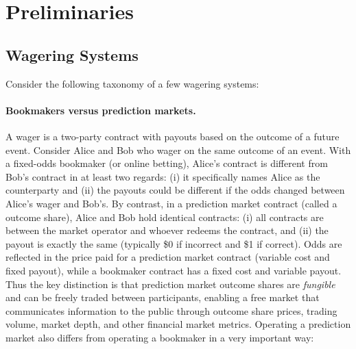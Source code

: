 \section{Preliminaries}

\subsection{Wagering Systems}

Consider the following taxonomy of a few wagering systems:


\paragraph{Bookmakers versus prediction markets.}

A wager is a two-party contract with payouts based on the outcome of a future event. Consider Alice and Bob who wager on the same outcome of an event. With a fixed-odds bookmaker (or online betting), Alice's contract is different from Bob's contract in at least two regards: (i) it specifically names Alice as the counterparty and (ii) the payouts could be different if the odds changed between Alice's wager and Bob's. By contrast, in a prediction market contract (called a outcome share), Alice and Bob hold identical contracts: (i) all contracts are between the market operator and whoever redeems the contract, and (ii) the payout is exactly the same (typically \$0 if incorrect and \$1 if correct). Odds are reflected in the price paid for a prediction market contract (\ie variable cost and fixed payout), while a bookmaker contract has a fixed cost and variable payout. Thus the key distinction is that prediction market outcome shares are \textit{fungible} and can be freely traded between participants, enabling a free market that communicates information to the public through outcome share prices, trading volume, market depth, and other financial market metrics. Operating a prediction market also differs from operating a bookmaker in a very important way: 

